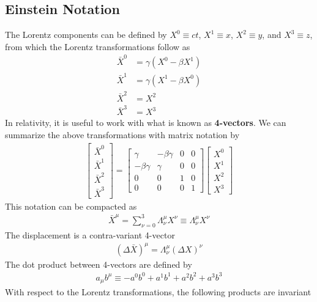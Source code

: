 \begin{multicols}{2}
\subsection{Einstein Notation}
The Lorentz components can be defined by $X^0\equiv ct$, $X^1\equiv x$, $X^2\equiv y$, and $X^3\equiv z$, from which the Lorentz transformations follow as
\begin{align}
	\bar{X}^0  &= \gamma (X^0-\beta X^1) \\
	\bar{X}^1  &= \gamma (X^1-\beta X^0) \\
	\bar{X}^2  &= X^2 \\
	\bar{X}^3  &= X^3
\end{align}
In relativity, it is useful to work with what is known as \textbf{4-vectors}. We can summarize the above transformations with matrix notation by
\begin{align}
	\begin{bmatrix}
		\bar{X}^0 \\\bar{X}^1\\\bar{X}^2\\\bar{X}^3
	\end{bmatrix} = 
	\begin{bmatrix}
		\gamma & -\beta \gamma & 0 & 0 \\
		-\beta \gamma & \gamma & 0 & 0 \\
		0 & 0 & 1 & 0 \\
		0 & 0 & 0 & 1
	\end{bmatrix}
	\begin{bmatrix}
	X^0 \\ X^1 \\ X^2 \\ X^3
\end{bmatrix}
\end{align}
This notation can be compacted as
\begin{align}
	\bar{X}^\mu = \sum_{\nu=0}^{3}\Lambda_\nu^\mu X^\nu \equiv \Lambda_\nu^\mu X^\nu
\end{align}
The displacement is a contra-variant 4-vector
\begin{align}
	(\Delta\bar{X})^\mu = \Lambda_\nu^\mu (\Delta X)^\nu
\end{align} 
The dot product between 4-vectors are defined by
\begin{align}
	a_\mu b^\mu \equiv -a^0b^0+a^1b^1+a^2b^2+a^3b^3
\end{align}
With respect to the Lorentz transformations, the following products are invariant
\begin{align}

\end{align}
\end{multicols}
